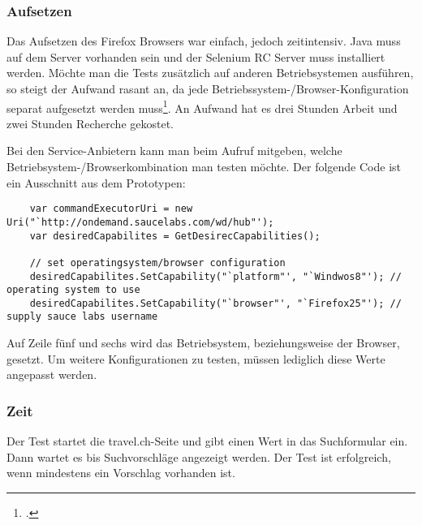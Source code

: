 \subsubsection{Aufsetzen}
Das Aufsetzen des Firefox Browsers war einfach, jedoch zeitintensiv. Java muss auf dem Server vorhanden sein und der Selenium RC Server muss installiert werden. Möchte man die Tests zusätzlich auf anderen Betriebsystemen ausführen, so steigt der Aufwand rasant an, da jede Betriebssystem-/Browser-Konfiguration separat aufgesetzt werden muss\footcite{Selenium_Linux}. An Aufwand hat es drei Stunden Arbeit und zwei Stunden Recherche gekostet.

Bei den Service-Anbietern kann man beim Aufruf mitgeben, welche Betriebsystem-/Browserkombination man testen möchte. Der folgende Code ist ein Ausschnitt aus dem Prototypen:

\begin{lstlisting}
    var commandExecutorUri = new Uri("`http://ondemand.saucelabs.com/wd/hub"');
    var desiredCapabilites = GetDesirecCapabilities();

    // set operatingsystem/browser configuration
    desiredCapabilites.SetCapability("`platform"', "`Windwos8"'); // operating system to use
    desiredCapabilites.SetCapability("`browser"', "`Firefox25"'); // supply sauce labs username
\end{lstlisting}
Auf Zeile fünf und sechs wird das Betriebsystem, beziehungsweise der Browser, gesetzt. Um weitere Konfigurationen zu testen, müssen lediglich diese Werte angepasst werden.

\subsubsection{Zeit}
Der Test startet die travel.ch-Seite und gibt einen Wert in das Suchformular ein. Dann wartet es bis Suchvorschläge angezeigt werden. Der Test ist erfolgreich, wenn mindestens ein Vorschlag vorhanden ist.


